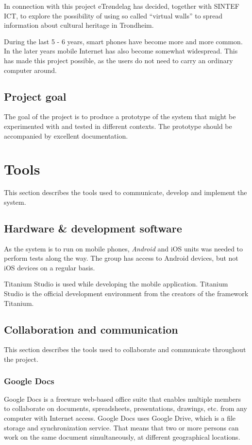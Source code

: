 \documentclass[11pt]{book}
\begin{document}
In connection with this project eTrøndelag has decided, together with SINTEF ICT, to explore the possibility of using so called ``virtual walls'' to spread information about cultural heritage in Trondheim.

During the last 5 - 6 years, smart phones have become more and more common. In the later years mobile Internet has also become somewhat widespread. This has made this project possible, as the users do not need to carry an ordinary computer around.

\subsection{Project goal}
The goal of the project is to produce a prototype of the system that might be experimented with and tested in different contexts. The prototype should be accompanied by excellent documentation.

\section{Tools}
This section describes the tools used to communicate, develop and implement the system.

\subsection{Hardware \& development software}
As the system is to run on mobile phones, \emph{Android} and iOS units was needed to perform tests along the way. The group has access to Android devices, but not iOS devices on a regular basis.

Titanium Studio\cite{titaniumStudio} is used while developing the mobile application. Titanium Studio is the official development environment from the creators of the framework Titanium.

\subsection{Collaboration and communication}
This section describes the tools used to collaborate and communicate throughout the project.

\subsubsection{Google Docs}
Google Docs\cite{googleDocs} is a freeware web-based office suite that enables multiple members to collaborate on documents, spreadsheets, presentations, drawings, etc. from any computer with Internet access. Google Docs uses Google Drive, which is a file storage and synchronization service. That means that two or more persons can work on the same document simultaneously, at different geographical locations. 
\end{document}
